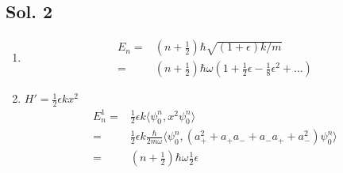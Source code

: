 \begin{enumerate}
    
\end{enumerate}

\subsection*{Sol. 2}
\begin{enumerate}
    \item 
    \begin{align*}
        E_n =& (n+\frac{1}{2})\hbar\sqrt{(1+\epsilon)k/m}\\
        =&(n+\frac{1}{2})\hbar\omega(1+\frac{1}{2}\epsilon-\frac{1}{8}\epsilon^2+\dots)
    \end{align*}
    \item $H'=\frac{1}{2}\epsilon kx^2$
    \begin{align*}
        E^1_n=&\frac{1}{2}\epsilon k\langle\psi^n_0, x^2\psi^n_0\rangle\\
        =&\frac{1}{2}\epsilon k\frac{\hbar}{2m\omega}
        \langle \psi^n_0, (a_+^2 + a_+a_- + a_-a_+ + a_-^2)\psi^n_0\rangle\\
        =& (n+\frac{1}{2})\hbar\omega\frac{1}{2}\epsilon
    \end{align*}
\end{enumerate}

